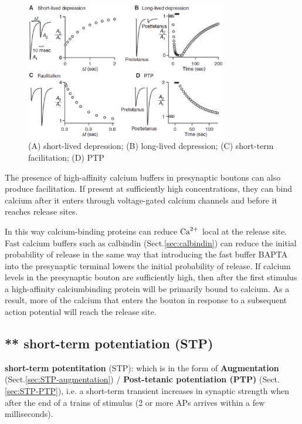 \begin{figure}[htbp]
  \centerline{\includegraphics[height=6cm]{./images/short-term-plasticity.eps}}
  \caption{(A) short-lived depression; (B)
  long-lived depression; (C) short-term
  facilitation; (D) PTP \citep{regehr2012}}\label{fig:short-term-plasticity}
\end{figure}

The presence of high-affinity calcium buffers in presynaptic boutons can also
produce facilitation. If present at sufficiently high concentrations, they can
bind calcium after it enters through voltage-gated calcium channels and before
it reaches release sites.

In this way calcium-binding proteins can reduce ${\text{Ca}^{2+}}$ local at the release site.
Fast calcium buffers such as calbindin (Sect.\ref{sec:calbindin}) can reduce the
initial probability of release in the same way that introducing the fast
buffer BAPTA into the presynaptic terminal lowers the initial probability of
release. If calcium levels in the presynaptic bouton are sufficiently high, then
after the first stimulus a high-affinity calciumbinding protein will be
primarily bound to calcium.
As a result, more of the calcium that enters the bouton in response to a
subsequent action potential will reach the release site.

\subsection{** short-term potentiation (STP)}
\label{sec:short-term-potentiation}

{\bf short-term potentitation}  (STP): which is in the form of {\bf
Augmentation} (Sect.\ref{sec:STP-augmentation}) / {\bf Post-tetanic potentiation
(PTP)} (Sect.\ref{sec:STP-PTP}), i.e. a short-term transient increases in
synaptic strength when after the end of a trains of stimulus (2 or more APs
arrives within a few  milliseconds).

